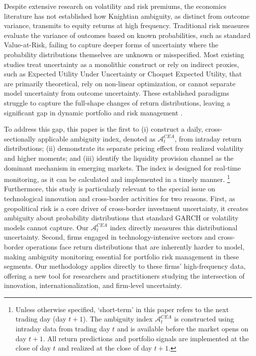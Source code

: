 \documentclass[preprint,12pt,authoryear]{elsarticle}
\renewcommand{\textcolor}[2]{\begingroup\color{#1}#2\endgroup}
\begin{document}
\textcolor{red}{Despite extensive research on volatility and risk premiums, the economics literature has not established how Knightian ambiguity, as distinct from outcome variance, transmits to equity returns at high frequency. Traditional risk measures evaluate the variance of outcomes based on known probabilities, such as standard Value-at-Risk, failing to capture deeper forms of uncertainty where the probability distributions themselves are unknown or misspecified. Most existing studies treat uncertainty as a monolithic construct or rely on indirect proxies, such as Expected Utility Under Uncertainty or Choquet Expected Utility, that are primarily theoretical, rely on non-linear optimization, or cannot separate model uncertainty from outcome uncertainty. These established paradigms struggle to capture the full-shape changes of return distributions, leaving a significant gap in dynamic portfolio and risk management \citep{Bollerslev1988}.}


\textcolor{red}{To address this gap, this paper is the first to (i) construct a daily, cross-sectionally applicable ambiguity index, denoted as $\mathcal{A}^{CEA}_t$, from intraday return distributions; (ii) demonstrate its separate pricing effect from realized volatility and higher moments; and (iii) identify the liquidity provision channel as the dominant mechanism in emerging markets. The index is designed for real-time monitoring, as it can be calculated and implemented in a timely manner. \footnote{\textcolor{red}{Unless otherwise specified, `short-term' in this paper refers to the next trading day (day $t+1$). The ambiguity index $\mathcal{A}^{CEA}_t$ is constructed using intraday data from trading day $t$ and is available before the market opens on day $t+1$. All return predictions and portfolio signals are implemented at the close of day $t$ and realized at the close of day $t+1$.}} Furthermore, this study is particularly relevant to the special issue on technological innovation and cross-border activities for two reasons. First, as geopolitical risk is a core driver of cross-border investment uncertainty, it creates ambiguity about probability distributions that standard GARCH or volatility models cannot capture. Our $\mathcal{A}^{CEA}_t$ index directly measures this distributional uncertainty. Second, firms engaged in technology-intensive sectors and cross-border operations face return distributions that are inherently harder to model, making ambiguity monitoring essential for portfolio risk management in these segments. Our methodology applies directly to these firms' high-frequency data, offering a new tool for researchers and practitioners studying the intersection of innovation, internationalization, and firm-level uncertainty.}
\end{document}
